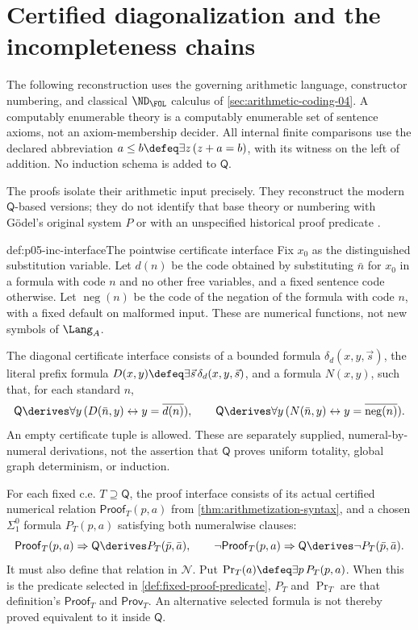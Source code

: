 \section{Certified diagonalization and the incompleteness chains}
\label{sec:p05-inc}

The following reconstruction uses the governing arithmetic language,
constructor numbering, and classical \(\ND_{\FOL}\) calculus of
\cref{sec:arithmetic-coding-04}. A computably enumerable theory is a
computably enumerable set of sentence axioms, not an axiom-membership
decider. All internal finite comparisons use the declared abbreviation
\(a\leq b\defeq\exists z\,(z+a=b)\), with its witness on the left of
addition. No induction schema is added to \(\mathsf Q\).

The proofs isolate their arithmetic input precisely. They reconstruct the
modern \(\mathsf Q\)-based versions; they do not identify that base theory
or numbering with G\"odel's original system \(P\)
\cite[Satz V--VI, pp.~186--190]{Godel1931} or with an unspecified historical
proof predicate \cite{Rosser1936}.

\begin{hbdefinition}{def:p05-inc-interface}{The pointwise certificate interface}
Fix \(x_0\) as the distinguished substitution variable. Let \(d(n)\)
be the code obtained by substituting \(\bar n\) for \(x_0\) in a formula
with code \(n\) and no other free variables, and a fixed sentence code
otherwise. Let \(\operatorname{neg}(n)\) be the code of the negation of
the formula with code \(n\), with a fixed default on malformed input.
These are numerical functions, not new symbols of \(\Lang_A\).

The diagonal certificate interface consists of a bounded formula
\(\delta_d(x,y,\vec s)\), the literal prefix formula
\(D(x,y)\defeq\exists\vec s\,\delta_d(x,y,\vec s)\), and a formula
\(N(x,y)\), such that, for each standard \(n\),
\[
 \mathsf Q\derives\forall y\,
       (D(\bar n,y)\leftrightarrow y=\overline{d(n)}),
 \qquad
 \mathsf Q\derives\forall y\,
       (N(\bar n,y)\leftrightarrow y=\overline{\operatorname{neg}(n)}).
\]
An empty certificate tuple is allowed. These are separately supplied,
numeral-by-numeral derivations, not the assertion that \(\mathsf Q\)
proves uniform totality, global graph determinism, or induction.

For each fixed c.e. \(T\supseteq\mathsf Q\), the proof interface consists
of its actual certified numerical relation \(\mathsf{Proof}_T(p,a)\)
from \cref{thm:arithmetization-syntax}, and a chosen \(\Sigma^0_1\)
formula \(P_T(p,a)\) satisfying both numeralwise clauses:
\[
 \mathsf{Proof}_T(p,a)\Rightarrow
       \mathsf Q\derives P_T(\bar p,\bar a),\qquad
 \neg\mathsf{Proof}_T(p,a)\Rightarrow
       \mathsf Q\derives\neg P_T(\bar p,\bar a).
\]
It must also define that relation in \(\mathcal N\). Put
\(\operatorname{Pr}_T(a)\defeq\exists p\,P_T(p,a)\).
When this is the predicate selected in \cref{def:fixed-proof-predicate},
\(P_T\) and \(\operatorname{Pr}_T\) are that definition's
\(\mathsf{Proof}_T\) and \(\mathsf{Prov}_T\). An alternative selected
formula is not thereby proved equivalent to it inside \(\mathsf Q\).
\end{hbdefinition}

